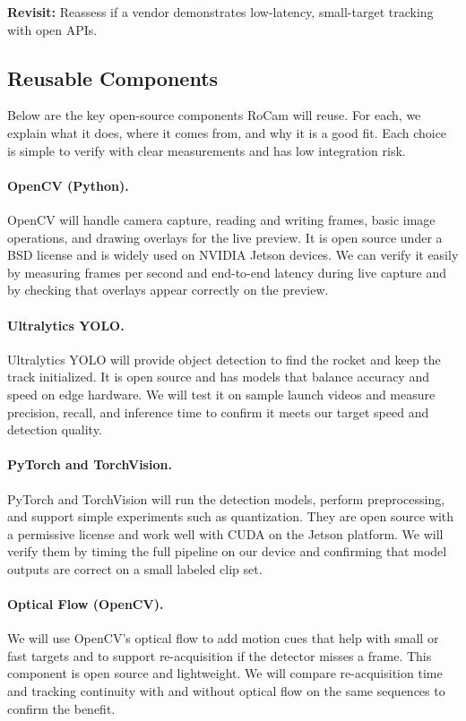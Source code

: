 \documentclass[12pt]{article}
\begin{document}
\textbf{Revisit:} Reassess if a vendor demonstrates low-latency, small-target tracking with open APIs.


\subsection{Reusable Components}
\label{sec:reusable-components}

Below are the key open-source components RoCam will reuse. For each, we explain what it does, where it comes from, and why it is a good fit. Each choice is simple to verify with clear measurements and has low integration risk.

\paragraph{OpenCV (Python).}
OpenCV will handle camera capture, reading and writing frames, basic image operations, and drawing overlays for the live preview. It is open source under a BSD license and is widely used on NVIDIA Jetson devices. We can verify it easily by measuring frames per second and end-to-end latency during live capture and by checking that overlays appear correctly on the preview.

\paragraph{Ultralytics YOLO.}
Ultralytics YOLO will provide object detection to find the rocket and keep the track initialized. It is open source and has models that balance accuracy and speed on edge hardware. We will test it on sample launch videos and measure precision, recall, and inference time to confirm it meets our target speed and detection quality.

\paragraph{PyTorch and TorchVision.}
PyTorch and TorchVision will run the detection models, perform preprocessing, and support simple experiments such as quantization. They are open source with a permissive license and work well with CUDA on the Jetson platform. We will verify them by timing the full pipeline on our device and confirming that model outputs are correct on a small labeled clip set.

\paragraph{Optical Flow (OpenCV).}
We will use OpenCV’s optical flow to add motion cues that help with small or fast targets and to support re-acquisition if the detector misses a frame. This component is open source and lightweight. We will compare re-acquisition time and tracking continuity with and without optical flow on the same sequences to confirm the benefit.
\end{document}
